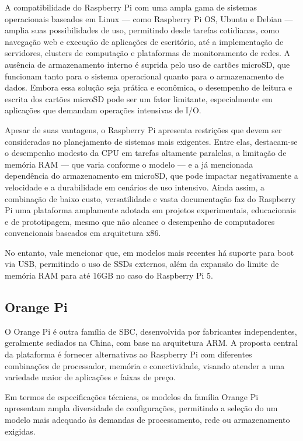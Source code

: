 A compatibilidade do Raspberry Pi com uma ampla gama de sistemas operacionais baseados em Linux — como Raspberry Pi OS, Ubuntu e Debian — amplia suas possibilidades de uso, permitindo desde tarefas cotidianas, como navegação web e execução de aplicações de escritório, até a implementação de servidores, clusters de computação e plataformas de monitoramento de redes. A ausência de armazenamento interno é suprida pelo uso de cartões microSD, que funcionam tanto para o sistema operacional quanto para o armazenamento de dados. Embora essa solução seja prática e econômica, o desempenho de leitura e escrita dos cartões microSD pode ser um fator limitante, especialmente em aplicações que demandam operações intensivas de I/O.

Apesar de suas vantagens, o Raspberry Pi apresenta restrições que devem ser consideradas no planejamento de sistemas mais exigentes. Entre elas, destacam-se o desempenho modesto da CPU em tarefas altamente paralelas, a limitação de memória RAM — que varia conforme o modelo — e a já mencionada dependência do armazenamento em microSD, que pode impactar negativamente a velocidade e a durabilidade em cenários de uso intensivo. Ainda assim, a combinação de baixo custo, versatilidade e vasta documentação faz do Raspberry Pi uma plataforma amplamente adotada em projetos experimentais, educacionais e de prototipagem, mesmo que não alcance o desempenho de computadores convencionais baseados em arquitetura x86.

No entanto, vale mencionar que, em modelos mais recentes há suporte para boot via USB, permitindo o uso de SSDs externos, além da expansão do limite de memória RAM para até 16GB no caso do Raspberry Pi 5. 

\subsection{Orange Pi}
\label{subsection:OrangePi}

O Orange Pi \citep{orangepihw2025} é outra família de SBC, desenvolvida por fabricantes independentes, geralmente sediados na China, com base na arquitetura ARM. A proposta central da plataforma é fornecer alternativas ao Raspberry Pi com diferentes combinações de processador, memória e conectividade, visando atender a uma variedade maior de aplicações e faixas de preço.

Em termos de especificações técnicas, os modelos da família Orange Pi apresentam ampla diversidade de configurações, permitindo a seleção do um modelo mais adequado às demandas de processamento, rede ou armazenamento exigidas.

